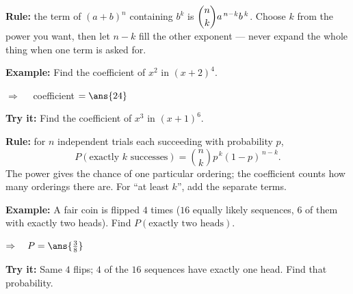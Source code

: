 \documentclass[12pt]{article}
\begin{document}

\begin{formulabox}
\textbf{Rule:} the term of $(a+b)^n$ containing $b^k$ is $\dbinom{n}{k}a^{\,n-k}b^{\,k}$.
Choose $k$ from the power you want, then let $n - k$ fill the other exponent --- never expand
the whole thing when one term is asked for.
\end{formulabox}

\begin{examplebox}
\textbf{Example:} \quad Find the coefficient of $x^2$ in $(x + 2)^4$.

$\Rightarrow\quad$ coefficient $= \ans{24}$
\end{examplebox}

\begin{tryitbox}
\textbf{Try it:} \quad Find the coefficient of $x^3$ in $(x + 1)^6$.\\[2pt]
\end{tryitbox}


\begin{formulabox}
\textbf{Rule:} for $n$ independent trials each succeeding with probability $p$,
\[ P(\text{exactly } k \text{ successes}) = \binom{n}{k}p^{\,k}(1-p)^{\,n-k}. \]
The power gives the chance of one particular ordering; the coefficient counts how many
orderings there are. For ``at least $k$'', add the separate terms.
\end{formulabox}

\begin{examplebox}
\textbf{Example:} \quad A fair coin is flipped $4$ times ($16$ equally likely sequences, $6$ of them with exactly two heads). Find $P(\text{exactly two heads})$.

$\Rightarrow\quad P = \ans{\tfrac{3}{8}}$
\end{examplebox}

\begin{tryitbox}
\textbf{Try it:} \quad Same $4$ flips; $4$ of the $16$ sequences have exactly one head.
Find that probability.\\[2pt]
\end{tryitbox}
\end{document}

